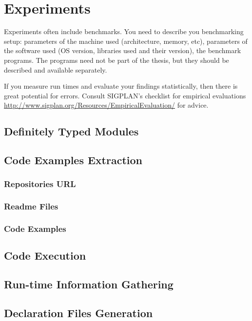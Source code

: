 \chapter{Experiments}\label{chap:experiments}

Experiments often include benchmarks.
You need to describe you benchmarking setup: parameters of the machine used (architecture, memory, etc), parameters of the software used (OS version, libraries used and their version), the benchmark programs.
The programs need not be part of the thesis, but they should be described and available separately.

If you measure run times and evaluate your findings statistically, then there is great potential for errors.
Consult SIGPLAN's checklist for empirical evaluations \url{http://www.sigplan.org/Resources/EmpiricalEvaluation/} for advice. 




\section{Definitely Typed Modules}
\section{Code Examples Extraction}
\subsection{Repositories URL}
\subsection{Readme Files}
\subsection{Code Examples}

\section{Code Execution}

\section{Run-time Information Gathering}

\section{Declaration Files Generation}

